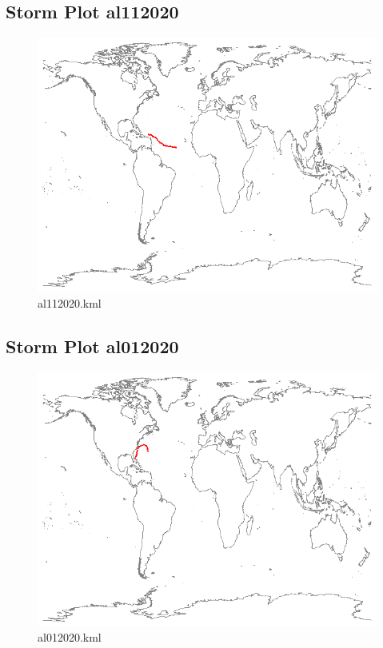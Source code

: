 \documentclass[]{article}
\begin{document}
\subsection{Storm Plot al112020}
\begin{figure}[htbp]
    \centering
\includegraphics{al112020.png}
\caption{al112020.kml}
\label{fig:al112020}
\end{figure}

\clearpage
\subsection{Storm Plot al012020}

\begin{figure}[htbp]
    \centering
\includegraphics{al012020.png}
\caption{al012020.kml}
\label{fig:al012020}
\end{figure}
\end{document}
